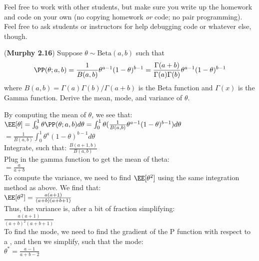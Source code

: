 \documentclass[12pt,letterpaper,fleqn]{hmcpset}
\begin{document}
Feel free to work with other students, but make sure you write up the homework
and code on your own (no copying homework \textit{or} code; no pair programming).
Feel free to ask students or instructors for help debugging code or whatever else,
though.

\begin{problem}[1]
(\textbf{Murphy 2.16}) Suppose $\theta \sim \text{Beta}(a,b)$ such
        that
        \[
            \PP(\theta; a,b) = \frac{1}{B(a,b)} \theta^{a-1}(1-\theta)^{b-1} = \frac{\Gamma(a+b)}{\Gamma(a)\Gamma(b)} \theta^{a-1}(1-\theta)^{b-1}
        \]
        where $B(a,b) = \Gamma(a)\Gamma(b)/\Gamma(a+b)$ is the Beta function
        and $\Gamma(x)$ is the Gamma function.
        Derive the mean, mode, and variance of $\theta$.
\end{problem}
\begin{solution}
By computing the mean of $\theta$, we see that:\\$
\EE[\theta] = \int_0^1 \theta \PP(\theta; a,b) d\theta = \int_0^1 \theta (\frac{1}{B(a,b)} \theta^{a-1}(1-\theta)^{b-1})d\theta$\\
$ = \frac{1}{B(a,b)} \int_0^1 \theta^a (1-\theta)^{b-1} d\theta $\\
Integrate, such that: $ \frac{B(a+1,b)}{B(a,b)} $ \\
Plug in the gamma function to get the mean of theta: \\
$= \frac{a}{a+b} $\\
To compute the variance, we need to find $\EE[\theta^2]$ using the same integration method as above. We find that: \\$
\EE[\theta^2] = \frac{a(a+1)}{(a+b)(a+b+1)} $\\
Thus, the variance is, after a bit of fraction simplifying: \\
$ \frac {a(a+1)}{(a+b)^2(a+b+1)} $ \\
To find the mode, we need to find the gradient of the P function with respect to a , and then we simplify, such that the mode: \\
$ \theta^* = \frac{a-1}{a+b-2} $




\end{solution}
\newpage
\end{document}

